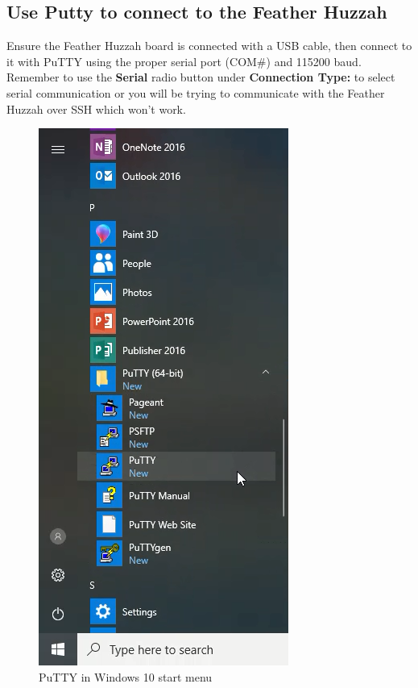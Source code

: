 \documentclass{book}
\makeatletter
\def\maxwidth{\ifdim\Gin@nat@width>\linewidth\linewidth
    \else\Gin@nat@width\fi}
\let\Oldincludegraphics\includegraphics
\renewcommand{\includegraphics}[1]{\Oldincludegraphics[width=.8\maxwidth]{#1}}
\makeatother
\begin{document}
    
        \subsection{Use Putty to connect to the Feather
Huzzah}\label{use-putty-to-connect-to-the-feather-huzzah}
    




    
        Ensure the Feather Huzzah board is connected with a USB cable, then
connect to it with PuTTY using the proper serial port (COM\#) and 115200
baud. Remember to use the \textbf{Serial} radio button under
\textbf{Connection Type:} to select serial communication or you will be
trying to communicate with the Feather Huzzah over SSH which won't work.

\begin{figure}
\centering
\includegraphics{images/putty_in_start_menu.png}
\caption{PuTTY in Windows 10 start menu}
\end{figure}
\end{document}
